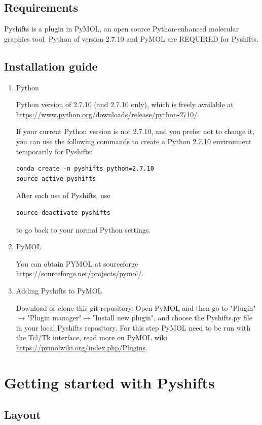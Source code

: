 \documentclass{article}
\begin{document}
\subsection{Requirements}
Pyshifts is a plugin in PyMOL, an open source Python-enhanced molecular graphics tool. Python of version 2.7.10 and PyMOL are REQUIRED for Pyshifts.


\subsection{Installation guide}
\begin{enumerate}
\item{Python}

Python version of 2.7.10 (and 2.7.10 only), which is freely available at \url{https://www.python.org/downloads/release/python-2710/}.

If your current Python version is not 2.7.10, and you prefer not to change it, you can use the following commands to create a Python 2.7.10 environment temporarily for Pyshifts:

\begin{lstlisting}
conda create -n pyshifts python=2.7.10
source active pyshifts
\end{lstlisting}
After each use of Pyshifts, use
\begin{lstlisting}
source deactivate pyshifts
\end{lstlisting}
to go back to your normal Python settings.
\item{PyMOL}

You can obtain PYMOL at sourceforge https://sourceforge.net/projects/pymol/.

\item{Adding Pyshifts to PyMOL}

Download or clone this git repository.
Open PyMOL and then go to "Plugin"$\to$"Plugin manager"$\to$"Install new plugin", and choose the Pyshifts.py file in your local Pyshifts repository. For this step PyMOL need to be run with the Tcl/Tk interface, read more on PyMOL wiki \url{https://pymolwiki.org/index.php/Plugins}.

\end{enumerate}



\newpage
\section{Getting started with Pyshifts}

\subsection{Layout}
\end{document}
